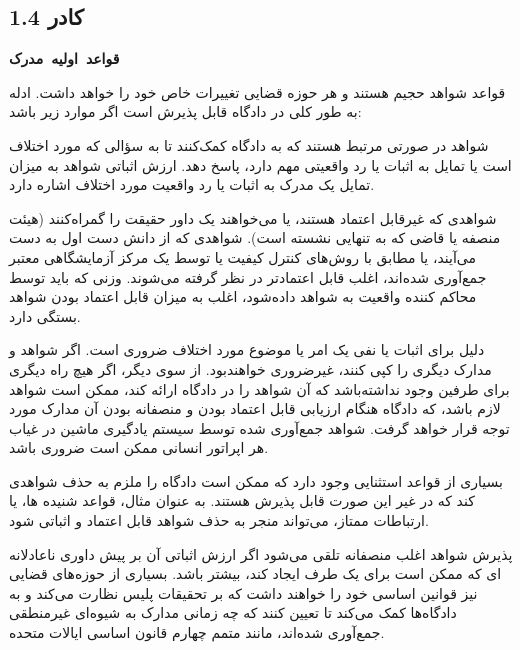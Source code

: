 \begin{tcolorbox}[colback=gray!10,colframe=black,breakable]

    \section*{کادر 1.4}
    \label{sec:کادر 1.4}
    \begin{Large}
        \textbf{\mbox{قواعد اولیه مدرک}}
    \end{Large}
    \newline
    قواعد شواهد حجیم هستند و هر حوزه قضایی تغییرات خاص خود را خواهد داشت.
    ادله به طور کلی در دادگاه قابل پذیرش است اگر موارد زیر باشد:

    \begin{description}[leftmargin=0.5cm,style=nextline]
        \item[مربوط:] شواهد در صورتی مرتبط هستند که به دادگاه کمک‌کنند تا به سؤالی که مورد اختلاف است یا تمایل به اثبات یا رد واقعیتی مهم دارد، پاسخ دهد.
        ارزش اثباتی شواهد به میزان تمایل یک مدرک به اثبات یا رد واقعیت مورد اختلاف اشاره دارد.
        \item[قابل اعتماد:] شواهدی که غیرقابل اعتماد هستند، یا می‌خواهند یک داور حقیقت را گمراه‌کنند (هیئت منصفه یا قاضی که به تنهایی نشسته است).
        شواهدی که از دانش دست اول به دست می‌آیند، یا مطابق با روش‌های کنترل کیفیت یا توسط یک مرکز آزمایشگاهی معتبر جمع‌آوری شده‌اند، اغلب قابل اعتمادتر در نظر گرفته می‌شوند.
        وزنی که باید توسط محاکم کننده واقعیت به شواهد داده‌شود، اغلب به میزان قابل اعتماد بودن شواهد بستگی دارد.
        \item[لازمه:] دلیل برای اثبات یا نفی یک امر یا موضوع مورد اختلاف ضروری است.
        اگر شواهد و مدارک دیگری را کپی کنند، غیرضروری خواهند‌بود.
        از سوی دیگر، اگر هیچ راه دیگری برای طرفین وجود نداشته‌باشد که آن شواهد را در دادگاه ارائه کند، ممکن است شواهد لازم باشد، که دادگاه هنگام ارزیابی قابل اعتماد بودن و منصفانه بودن آن مدارک مورد توجه قرار خواهد گرفت.
        شواهد جمع‌آوری شده توسط سیستم یادگیری ماشین در غیاب هر اپراتور انسانی ممکن است ضروری باشد.
        \item[مستثنی نشده:] بسیاری از قواعد استثنایی وجود دارد که ممکن است دادگاه را ملزم به حذف شواهدی کند که در غیر این صورت قابل پذیرش هستند.
        به عنوان مثال، قواعد شنیده ها، یا ارتباطات ممتاز، می‌تواند منجر به حذف شواهد قابل اعتماد و اثباتی شود.
        \item[منصفانه:] پذیرش شواهد اغلب منصفانه تلقی می‌شود اگر ارزش اثباتی آن بر پیش داوری ناعادلانه ای که ممکن است برای یک طرف ایجاد کند، بیشتر باشد.
        بسیاری از حوزه‌های قضایی نیز قوانین اساسی خود را خواهند داشت که بر تحقیقات پلیس نظارت می‌کند و به دادگاه‌ها کمک می‌کند تا تعیین کنند که چه زمانی مدارک به شیوه‌ای غیرمنطقی جمع‌آوری شده‌اند، مانند متمم چهارم قانون اساسی ایالات متحده.
    \end{description}
\end{tcolorbox}

